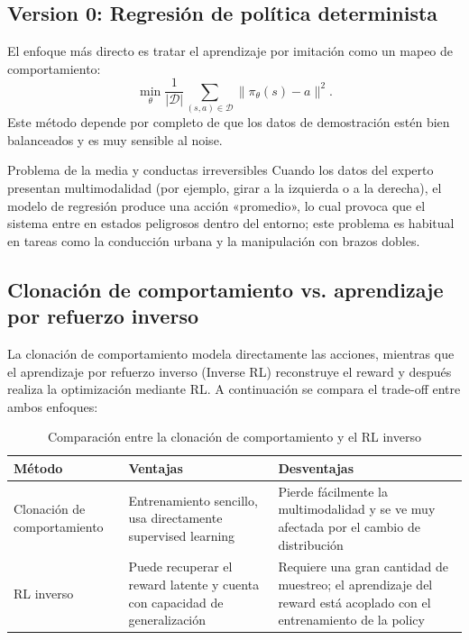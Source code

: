 \documentclass[a4paper]{article}
\begin{document}
\subsection{Version 0: Regresión de política determinista}

El enfoque más directo es tratar el aprendizaje por imitación como un mapeo de comportamiento:
$$\min_\theta \frac{1}{|\mathcal{D}|}\sum_{(s,a) \in \mathcal{D}} \|\pi_\theta(s) - a\|^2.$$
Este método depende por completo de que los datos de demostración estén bien balanceados y es muy sensible al noise.

\begin{warningbox}{Problema de la media y conductas irreversibles}
Cuando los datos del experto presentan multimodalidad (por ejemplo, girar a la izquierda o a la derecha), el modelo de regresión produce una acción «promedio», lo cual provoca que el sistema entre en estados peligrosos dentro del entorno; este problema es habitual en tareas como la conducción urbana y la manipulación con brazos dobles.
\end{warningbox}

\subsection{Clonación de comportamiento vs. aprendizaje por refuerzo inverso}

La clonación de comportamiento modela directamente las acciones, mientras que el aprendizaje por refuerzo inverso (Inverse RL) reconstruye el reward y después realiza la optimización mediante RL. A continuación se compara el trade-off entre ambos enfoques:

\begin{table}[H]
\centering
\begin{tabular}{p{} p{} p{}}
\toprule
Método & Ventajas & Desventajas \\
\midrule
Clonación de comportamiento & Entrenamiento sencillo, usa directamente supervised learning & Pierde fácilmente la multimodalidad y se ve muy afectada por el cambio de distribución \\
RL inverso & Puede recuperar el reward latente y cuenta con capacidad de generalización & Requiere una gran cantidad de muestreo; el aprendizaje del reward está acoplado con el entrenamiento de la policy \\
\bottomrule
\end{tabular}
\caption{Comparación entre la clonación de comportamiento y el RL inverso}
\end{table}
\end{document}
